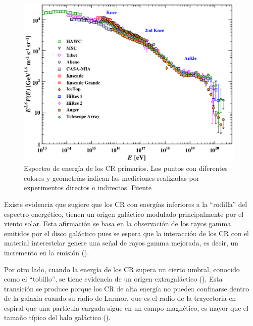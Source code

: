 \begin{figure}
    \centering
    \includegraphics[width=0.8\linewidth]{Figs/CR_spectrum.png}
    \caption{Espectro de energía de los CR primarios. Los puntos con diferentes colores y geometrías indican las mediciones realizadas por experimentos directos o indirectos. Fuente \cite{PDG}}
    \label{fig:spectrum}
\end{figure}

Existe evidencia que sugiere que los CR con energías inferiores a la “rodilla” del espectro energético, tienen un origen galáctico modulado principalmente por el viento solar. Esta afirmación se basa en la observación de los rayos gamma emitidos por el disco galáctico pues se espera que la interacción de los CR con el material interestelar genere una señal de rayos gamma mejorada, es decir, un incremento en la emisión (\cite{Cristofari_2023}).

Por otro lado, cuando la energía de los CR supera un cierto umbral, conocido como el “tobillo”, se tiene evidencia de un origen extragaláctico (\cite{augerextra}). Esta transición se produce porque los CR de alta energía no pueden confinarse dentro de la galaxia cuando su radio de Larmor, que es el radio de la trayectoria en espiral que una partícula cargada sigue en un campo magnético, es mayor que el tamaño típico del halo galáctico (\cite{spurio_2015}). 
